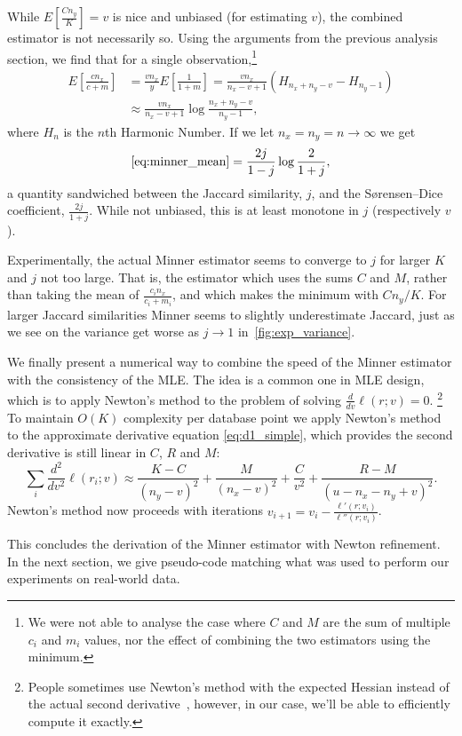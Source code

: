 While $E[\frac{C n_y}{K}] = v$ is nice and unbiased (for estimating $v$), the combined estimator is not necessarily so.
Using the arguments from the previous analysis section, we find that for a single observation,\footnote{We were not able to analyse the case where $C$ and $M$ are the sum of multiple $c_i$ and $m_i$ values, nor the effect of combining the two estimators using the minimum.}
\begin{align}
   E[\frac{c n_x}{c+m}]
   &= \frac{v n_x}{y} E[\frac{1}{1+m}]
   = \frac{v n_x}{n_x-v+1} (H_{n_x+n_y-v} - H_{n_y-1})
 \\&\approx \frac{v n_x}{n_x-v+1} \log\frac{n_x+n_y-v}{n_y-1},
 \label{eq:minner_mean}
\end{align}
where $H_n$ is the $n$th Harmonic Number.
If we let $n_x=n_y=n\to \infty$ we get
\[\eqref{eq:minner_mean} = \frac{2j}{1-j}\log\frac{2}{1+j},\]
a quantity sandwiched between the Jaccard similarity, $j$, and the Sørensen–Dice coefficient, $\frac{2j}{1+j}$.
While not unbiased, this is at least monotone in $j$ (respectively $v$).

Experimentally, the actual Minner estimator seems to converge to $j$ for larger $K$ and $j$ not too large.
That is, the estimator which uses the sums $C$ and $M$, rather than taking the mean of $\frac{c_i n_x}{c_i+m_i}$, and which makes the minimum with $Cn_y/K$.
For larger Jaccard similarities Minner seems to slightly underestimate Jaccard, just as we see on the variance get worse as $j\to1$ in~\cref{fig:exp_variance}.

\smallskip

We finally present a numerical way to combine the speed of the Minner estimator with the consistency of the MLE.
The idea is a common one in MLE design, which is to apply Newton's method to the problem of solving $\frac{d}{dv}\ell(r;v)=0$.%
\footnote{People sometimes use Newton's method with the expected Hessian instead of the actual second derivative~\cite{longford1987fast}, however, in our case, we'll be able to efficiently compute it exactly.}
To maintain $O(K)$ complexity per database point we apply Newton's method to the approximate derivative equation \cref{eq:d1_simple}, which provides the second derivative is still linear in $C$, $R$ and $M$:
\[
   \sum_i\frac{d^2}{dv^2}\ell(r_i; v) \approx
   \frac{K-C}{(n_y-v)^2} 
   +\frac{M}{(n_x-v)^2} 
   +\frac{C}{v^2}
   +\frac{R-M}{(u-n_x-n_y+v)^2}
   .
   \label{eq:d2_simple}
\]
Newton's method now proceeds with iterations
$v_{i+1} = v_i - \frac{\ell'(r; v_i)}{\ell''(r; v_i)}$.

This concludes the derivation of the Minner estimator with Newton refinement.
In the next section, we give pseudo-code matching what was used to perform our experiments on real-world data.

